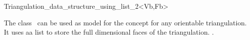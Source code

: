 

\begin{ccRefClass}{Triangulation_data_structure_using_list_2<Vb,Fb>}  %


\ccDefinition
  
The class \ccRefName\ can be used as model
for the  concept
 for any
orientable triangulation. It uses aa \stl list to store the
full dimensional faces of the triangulation.
.


\ccIsModel




\end{ccRefClass}


